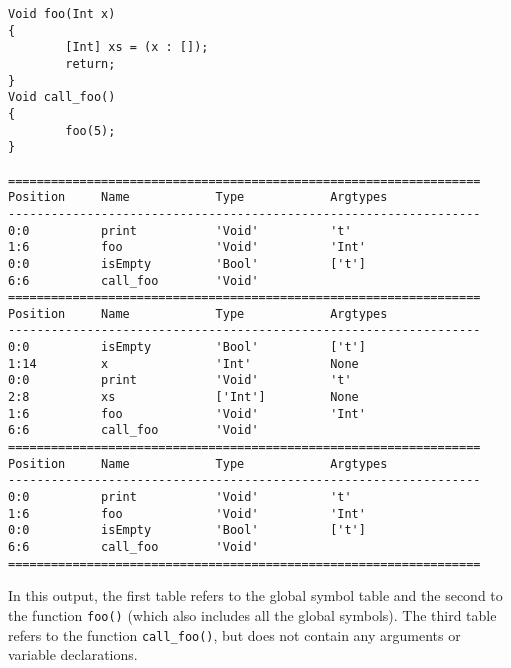 \documentclass[a4paper]{article}
\begin{document}
\begin{verbatim}
Void foo(Int x)
{
        [Int] xs = (x : []);
        return;
}
Void call_foo()
{
        foo(5);
}

==================================================================
Position     Name            Type            Argtypes            
------------------------------------------------------------------
0:0          print           'Void'          't'                 
1:6          foo             'Void'          'Int'               
0:0          isEmpty         'Bool'          ['t']               
6:6          call_foo        'Void'                              
==================================================================
Position     Name            Type            Argtypes            
------------------------------------------------------------------
0:0          isEmpty         'Bool'          ['t']               
1:14         x               'Int'           None                
0:0          print           'Void'          't'                 
2:8          xs              ['Int']         None                
1:6          foo             'Void'          'Int'               
6:6          call_foo        'Void'                              
==================================================================
Position     Name            Type            Argtypes            
------------------------------------------------------------------
0:0          print           'Void'          't'                 
1:6          foo             'Void'          'Int'               
0:0          isEmpty         'Bool'          ['t']               
6:6          call_foo        'Void'                              
==================================================================
\end{verbatim}
In this output, the first table refers to the global symbol table and the second to the function {\tt foo()} (which also includes all the global symbols). The third table refers to the function {\tt call\_foo()}, but does not contain any arguments or variable declarations.
\end{document}
